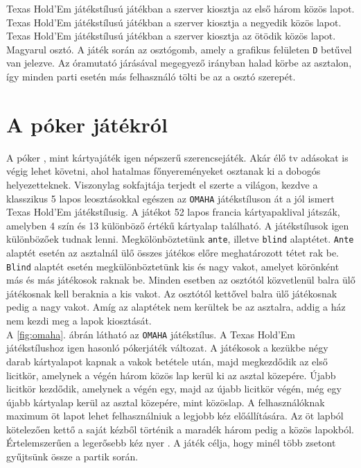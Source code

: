 Texas Hold'Em játékstílusú játékban a szerver kiosztja az első három közös lapot.
Texas Hold'Em játékstílusú játékban a szerver kiosztja a negyedik közös lapot.
Texas Hold'Em játékstílusú játékban a szerver kiosztja az ötödik közös lapot.
Magyarul osztó. A játék során az osztógomb, amely a grafikus felületen \texttt{D} betűvel van jelezve. Az óramutató járásával megegyező irányban halad körbe az asztalon, így minden parti esetén más felhasználó tölti be az a osztó szerepét.

\section{A póker játékról}
A póker \cite{poker_game}, mint kártyajáték igen népszerű szerencsejáték. Akár élő tv adásokat is végig lehet követni, ahol hatalmas főnyereményeket osztanak ki a dobogós helyezetteknek. Viszonylag sokfajtája terjedt el szerte a világon, kezdve a klasszikus 5 lapos leosztásokkal egészen az \texttt{OMAHA} játékstíluson át a jól ismert Texas Hold'Em játékstílusig. A játékot 52 lapos francia kártyapaklival játszák, amelyben 4 szín és 13 különböző értékű kártyalap található. A játékstílusok igen különbözőek tudnak lenni. Megkölönböztetünk \texttt{ante}, illetve \texttt{blind} alaptétet. \texttt{Ante} alaptét esetén az asztalnál ülő összes játékos előre meghatározott tétet rak be. \texttt{Blind} alaptét esetén megkülönböztetünk kis és nagy vakot, amelyet körönként más és más játékosok raknak be. Minden esetben az osztótól közvetlenül balra ülő játékosnak kell beraknia a kis vakot. Az osztótól kettővel balra ülő játékosnak pedig a nagy vakot. Amíg az alaptétek nem kerültek be az asztalra, addig a ház nem kezdi meg a lapok kiosztását. \\
A \ref{fig:omaha}. ábrán látható az \texttt{OMAHA} \cite{omaha_poker} játékstílus. A Texas Hold'Em játékstílushoz igen hasonló pókerjáték változat. A játékosok a kezükbe négy darab kártyalapot kapnak a vakok betétele után, majd megkezdődik az első licitkör, amelynek a végén három közös lap kerül ki az asztal közepére. Újabb licitkör kezdődik, amelynek a végén egy, majd az újabb licitkör végén, még egy újabb kártyalap kerül az asztal közepére, mint közöslap. A felhasználóknak maximum öt lapot lehet felhasználniuk a legjobb kéz előállítására. Az öt lapból kötelezően kettő a saját kézből történik a maradék három pedig a közös lapokból. Értelemszerűen a legerősebb kéz nyer \cite{card_combinations}. A játék célja, hogy minél több zsetont gyűjtsünk össze a partik során.
